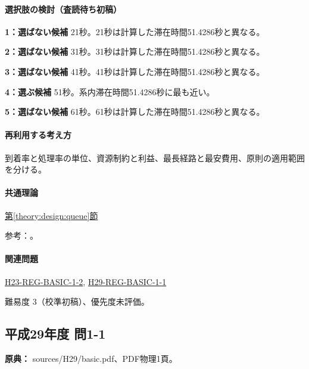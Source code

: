 \paragraph{選択肢の検討（査読待ち初稿）}\mbox{}\par

\noindent\textbf{1：選ばない候補} 21秒。21秒は計算した滞在時間51.4286秒と異なる。\par

\noindent\textbf{2：選ばない候補} 31秒。31秒は計算した滞在時間51.4286秒と異なる。\par

\noindent\textbf{3：選ばない候補} 41秒。41秒は計算した滞在時間51.4286秒と異なる。\par

\noindent\textbf{4：選ぶ候補} 51秒。系内滞在時間51.4286秒に最も近い。\par

\noindent\textbf{5：選ばない候補} 61秒。61秒は計算した滞在時間51.4286秒と異なる。\par

\paragraph{再利用する考え方} 到着率と処理率の単位、資源制約と利益、最長経路と最安費用、原則の適用範囲を分ける。

\paragraph{共通理論} \hyperref[theory:design:queue]{第\ref*{theory:design:queue}節}

\par 参考：\cite{design48_queue_ref}。

\paragraph{関連問題} \hyperref[q:h23-reg-basic-1-2]{H23-REG-BASIC-1-2}, \hyperref[q:h29-reg-basic-1-1]{H29-REG-BASIC-1-1}

\par 難易度 3（校準初稿）、優先度未評価。

\subsection{平成29年度 問1-1}
\label{q:h29-reg-basic-1-1}

\noindent\textbf{原典：} sources/H29/basic.pdf、PDF物理1頁。

